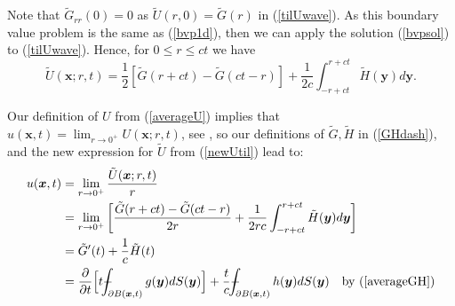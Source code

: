 \documentclass[a4paper, 12pt]{article}
\def\Xint#1{\mathchoice
{\XXint\displaystyle\textstyle{#1}}%
{\XXint\textstyle\scriptstyle{#1}}%
{\XXint\scriptstyle\scriptscriptstyle{#1}}%
{\XXint\scriptscriptstyle\scriptscriptstyle{#1}}%
\!\int}
\def\XXint#1#2#3{{\setbox0=\hbox{$#1{#2#3}{\int}$ }
\vcenter{\hbox{$#2#3$ }}\kern-.6\wd0}}
\def\dashint{\Xint-}
\numberwithin{equation}{section}
\begin{document}
Note that $\tilde{G}_{rr}(0)=0$ as $\tilde{U}(r,0)=\tilde{G}(r)$ in
(\ref{tilUwave}). As this boundary value problem is the same as (\ref{bvp1d}),
then we can apply the solution (\ref{bvpsol}) to (\ref{tilUwave}). Hence, for $0
\le r \le ct$ we have 
\begin{equation} \label{newUtil}
    \tilde{U}(\boldsymbol{x};r,t)=\frac{1}{2}\left[\tilde{G}(r+ct)-\tilde{G}(ct-r)\right]+\frac{1}{2c}\int^{r+ct}_{-r+ct}\tilde{H}(\boldsymbol{y})d\boldsymbol{y}.
\end{equation} 

Our definition of $U$ from (\ref{averageU}) implies that
 $u(\boldsymbol{x},t)=\lim_{r\rightarrow 0^+}U(\boldsymbol{x};r,t)$, see
 \cite[Ch. 2.4.1.c]{Ev}, so our definitions of $\tilde{G}, \tilde{H}$ in
 (\ref{GHdash}), and the new expression for $\tilde{U}$ from (\ref{newUtil})
 lead to:
\begin{equation} \label{almostK}
    \begin{aligned}
        u(\boldsymbol{x},t)&=\lim_{r\rightarrow 0^+}\frac{\tilde{U}(\boldsymbol{x};r,t)}{r}\\
        &=\lim_{r\rightarrow 0^+}\left[\frac{\tilde{G}(r+ct)-\tilde{G}(ct-r)}{2r}+\frac{1}{2rc}\int^{r+ct}_{-r+ct}\tilde{H}(\boldsymbol{y})d\boldsymbol{y}\right]\\
        &=\tilde{G}'(t)+\frac{1}{c}\tilde{H}(t)\\
        &=\diffp[1]{}{t}\Big[t\dashint_{\partial B(\boldsymbol{x},t)}{g(\boldsymbol{y})dS(\boldsymbol{y})} \Big]+\frac{t}{c}\dashint_{\partial B(\boldsymbol{x},t)}{h(\boldsymbol{y})dS(\boldsymbol{y})} \quad \textrm{by (\ref{averageGH})}
    \end{aligned}
\end{equation}
\end{document}
